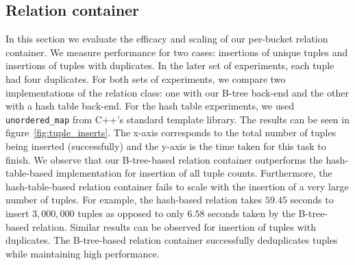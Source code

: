 \subsection{Relation container}
\label{sec:relation}

In this section we evaluate the efficacy and scaling of our per-bucket relation container. We measure performance for two cases: insertions of unique tuples and insertions of tuples with duplicates. In the later set of experiments, each tuple had four duplicates. For both sets of experiments, we compare two implementations of the relation class: one with our B-tree back-end and the other with a hash table back-end. For the hash table experiments, we used \texttt{unordered\_map} from C++'s standard template library. The results can be seen in figure~\ref{fig:tuple_inserts}. The x-axis corresponds to the total number of tuples being inserted (successfully) and the y-axis is the time taken for this task to finish. We observe that our B-tree-based relation container outperforms the hash-table-based implementation for insertion of all tuple counts. Furthermore, the hash-table-based relation container fails to scale with the insertion of a very large number of tuples. For example, the hash-based relation takes $59.45$ seconds to insert $3,\!000,\!000$ tuples as opposed to only $6.58$ seconds taken by the B-tree-based relation. Similar results can be observed for insertion of tuples with duplicates. The B-tree-based relation container successfully deduplicates tuples while maintaining high performance.





